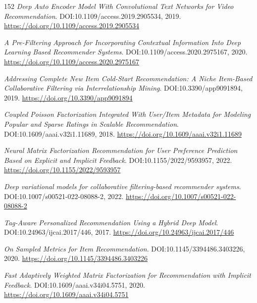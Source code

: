 \documentclass[11pt,a4paper]{article}
\begin{document}
\begin{thebibliography}{152}
\newblock \emph{Deep Auto Encoder Model With Convolutional Text Networks for Video Recommendation}.
\newblock DOI:10.1109/access.2019.2905534, 2019.
\newblock \url{https://doi.org/10.1109/access.2019.2905534}

\newblock \emph{A Pre-Filtering Approach for Incorporating Contextual Information Into Deep Learning Based Recommender Systems}.
\newblock DOI:10.1109/access.2020.2975167, 2020.
\newblock \url{https://doi.org/10.1109/access.2020.2975167}

\newblock \emph{Addressing Complete New Item Cold-Start Recommendation: A Niche Item-Based Collaborative Filtering via Interrelationship Mining}.
\newblock DOI:10.3390/app9091894, 2019.
\newblock \url{https://doi.org/10.3390/app9091894}

\newblock \emph{Coupled Poisson Factorization Integrated With User/Item Metadata for Modeling Popular and Sparse Ratings in Scalable Recommendation}.
\newblock DOI:10.1609/aaai.v32i1.11689, 2018.
\newblock \url{https://doi.org/10.1609/aaai.v32i1.11689}

\newblock \emph{Neural Matrix Factorization Recommendation for User Preference Prediction Based on Explicit and Implicit Feedback}.
\newblock DOI:10.1155/2022/9593957, 2022.
\newblock \url{https://doi.org/10.1155/2022/9593957}

\newblock \emph{Deep variational models for collaborative filtering-based recommender systems}.
\newblock DOI:10.1007/s00521-022-08088-2, 2022.
\newblock \url{https://doi.org/10.1007/s00521-022-08088-2}

\newblock \emph{Tag-Aware Personalized Recommendation Using a Hybrid Deep Model}.
\newblock DOI:10.24963/ijcai.2017/446, 2017.
\newblock \url{https://doi.org/10.24963/ijcai.2017/446}

\newblock \emph{On Sampled Metrics for Item Recommendation}.
\newblock DOI:10.1145/3394486.3403226, 2020.
\newblock \url{https://doi.org/10.1145/3394486.3403226}

\newblock \emph{Fast Adaptively Weighted Matrix Factorization for Recommendation with Implicit Feedback}.
\newblock DOI:10.1609/aaai.v34i04.5751, 2020.
\newblock \url{https://doi.org/10.1609/aaai.v34i04.5751}


\end{thebibliography}
\end{document}
